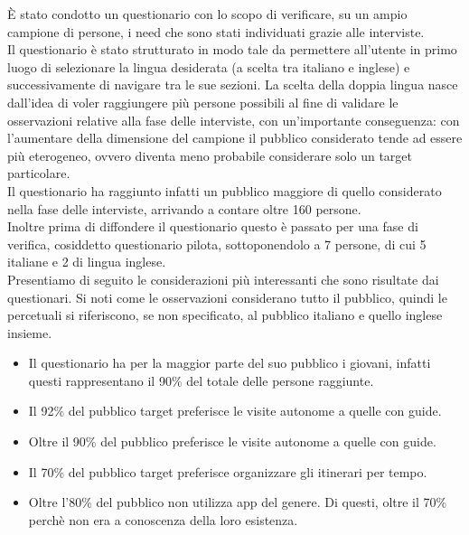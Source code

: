 È stato condotto un questionario con lo scopo di verificare, su un ampio campione di persone, i need che sono stati individuati grazie alle interviste.\\

Il questionario è stato strutturato in modo tale da permettere all'utente in primo luogo di selezionare la lingua desiderata (a scelta tra italiano e inglese) e successivamente di navigare tra le sue sezioni. La scelta della doppia lingua nasce dall'idea di voler 
raggiungere più persone possibili al fine di validare le osservazioni relative alla fase delle interviste, con un'importante conseguenza: con l'aumentare della dimensione del campione il pubblico considerato tende ad essere più eterogeneo, ovvero diventa meno probabile considerare solo un target particolare. \\

Il questionario ha raggiunto infatti un pubblico maggiore di quello considerato nella fase delle interviste, arrivando a contare oltre 160 persone. \\

Inoltre prima di diffondere il questionario questo è passato per una fase di verifica, cosiddetto questionario pilota, sottoponendolo a 7 persone, di cui 5 italiane e 2 di lingua inglese.\\

Presentiamo di seguito le considerazioni più interessanti che sono risultate dai questionari. Si noti come le osservazioni considerano tutto il pubblico, quindi le percetuali si riferiscono, se non specificato, al pubblico italiano e quello inglese insieme.

\begin{itemize}

\item Il questionario ha per la maggior parte del suo pubblico i giovani, infatti questi rappresentano il 90\% del totale delle persone raggiunte.

\item Il 92\% del pubblico target preferisce le visite autonome a quelle con guide.

\item Oltre il 90\% del pubblico preferisce le visite autonome a quelle con guide.

\item Il 70\% del pubblico target preferisce organizzare gli itinerari per tempo.

\item Oltre l'80\% del pubblico non utilizza app del genere. Di questi, oltre il 70\% perchè non era a conoscenza della loro esistenza.

\end{itemize}

